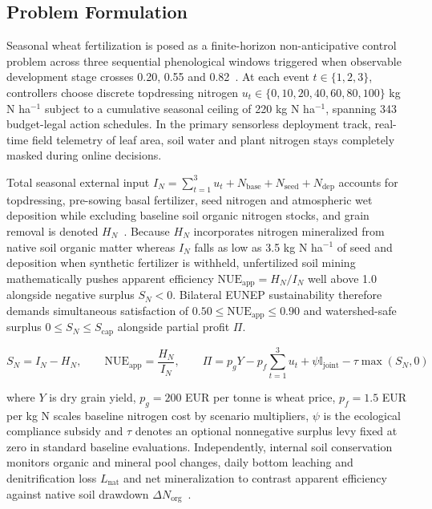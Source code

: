\documentclass[11pt,a4paper]{article}
\begin{document}
\subsection{Problem Formulation}

Seasonal wheat fertilization is posed as a finite-horizon non-anticipative control problem across three sequential phenological windows triggered when observable development stage crosses 0.20, 0.55 and 0.82~\citep{ceglar2019,baja2025}. At each event $t \in \{1, 2, 3\}$, controllers choose discrete topdressing nitrogen $u_t \in \{0, 10, 20, 40, 60, 80, 100\}$ kg N ha$^{-1}$ subject to a cumulative seasonal ceiling of 220 kg N ha$^{-1}$, spanning 343 budget-legal action schedules. In the primary sensorless deployment track, real-time field telemetry of leaf area, soil water and plant nitrogen stays completely masked during online decisions.

Total seasonal external input $I_N = \sum_{t=1}^{3} u_t + N_{\text{base}} + N_{\text{seed}} + N_{\text{dep}}$ accounts for topdressing, pre-sowing basal fertilizer, seed nitrogen and atmospheric wet deposition while excluding baseline soil organic nitrogen stocks, and grain removal is denoted $H_N$~\citep{eunep2015}. Because $H_N$ incorporates nitrogen mineralized from native soil organic matter whereas $I_N$ falls as low as 3.5 kg N ha$^{-1}$ of seed and deposition when synthetic fertilizer is withheld, unfertilized soil mining mathematically pushes apparent efficiency $\text{NUE}_{\text{app}} = H_N / I_N$ well above 1.0 alongside negative surplus $S_N < 0$. Bilateral EUNEP sustainability therefore demands simultaneous satisfaction of $0.50 \le \text{NUE}_{\text{app}} \le 0.90$ and watershed-safe surplus $0 \le S_N \le S_{\text{cap}}$ alongside partial profit $\Pi$.

\begin{equation}
S_N = I_N - H_N, \qquad \text{NUE}_{\text{app}} = \frac{H_N}{I_N}, \qquad \Pi = p_g Y - p_f \sum_{t=1}^{3} u_t + \psi \mathbb{I}_{\text{joint}} - \tau \max(S_N, 0)
\end{equation}

where $Y$ is dry grain yield, $p_g = 200$ EUR per tonne is wheat price, $p_f = 1.5$ EUR per kg N scales baseline nitrogen cost by scenario multipliers, $\psi$ is the ecological compliance subsidy and $\tau$ denotes an optional nonnegative surplus levy fixed at zero in standard baseline evaluations. Independently, internal soil conservation monitors organic and mineral pool changes, daily bottom leaching and denitrification loss $L_{\text{nat}}$ and net mineralization to contrast apparent efficiency against native soil drawdown $\Delta N_{\text{org}}$~\citep{silva2021,dewit2019}.
\end{document}
